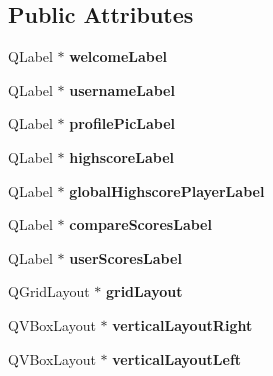 \subsection*{Public Attributes}
\begin{DoxyCompactItemize}
\item 
\mbox{\label{classhighscoresWindow_a654aa4e42e8ba559f23e642976ae9e42}} 
Q\+Label $\ast$ {\bfseries welcome\+Label}
\item 
\mbox{\label{classhighscoresWindow_a002904ffa299898e9576cd226f815709}} 
Q\+Label $\ast$ {\bfseries username\+Label}
\item 
\mbox{\label{classhighscoresWindow_a3d1bf62ae0cffa84683176a0ff234400}} 
Q\+Label $\ast$ {\bfseries profile\+Pic\+Label}
\item 
\mbox{\label{classhighscoresWindow_ae5ea50732f065fb4aa4dc3a26b3914bf}} 
Q\+Label $\ast$ {\bfseries highscore\+Label}
\item 
\mbox{\label{classhighscoresWindow_a9ecc8cab8e7751d64f7431e4ebaf85f9}} 
Q\+Label $\ast$ {\bfseries global\+Highscore\+Player\+Label}
\item 
\mbox{\label{classhighscoresWindow_aba4b0cb3772bda5ccbd16409abdb4113}} 
Q\+Label $\ast$ {\bfseries compare\+Scores\+Label}
\item 
\mbox{\label{classhighscoresWindow_a0908fff8fe3a818825e20097f31c49b2}} 
Q\+Label $\ast$ {\bfseries user\+Scores\+Label}
\item 
\mbox{\label{classhighscoresWindow_a539ed761ae3c21037fc042c268b5c70c}} 
Q\+Grid\+Layout $\ast$ {\bfseries grid\+Layout}
\item 
\mbox{\label{classhighscoresWindow_a6c8bfb5290972e41e1f30efd0e844359}} 
Q\+V\+Box\+Layout $\ast$ {\bfseries vertical\+Layout\+Right}
\item 
\mbox{\label{classhighscoresWindow_aada8bba383d3f270a4d835e5b875c74a}} 
Q\+V\+Box\+Layout $\ast$ {\bfseries vertical\+Layout\+Left}

\end{DoxyCompactItemize}
